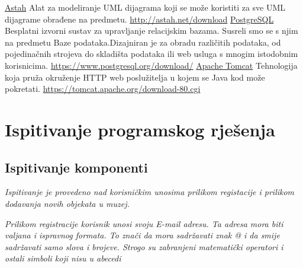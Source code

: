 			 \newline
			 \newline
			 \newpage
			 \noindent
			 \underline{Astah}
			 \newline
			 Alat za modeliranje UML dijagrama koji se može koristiti za sve UML dijagrame obrađene na predmetu.
			 \newline
			 \url{http://astah.net/download}
			 \newline
			 \newline
			 \underline{PostgreSQL}
			 \newline
			 Besplatni izvorni sustav za upravljanje relacijskim bazama. Susreli smo se s njim na predmetu Baze podataka.Dizajniran je za obradu različitih podataka, od pojedinačnih strojeva do skladišta podataka ili web usluga s mnogim istodobnim korisnicima.
			 \newline
			 \url{https://www.postgresql.org/download/}
			 \newline
			 \newline
			 \underline{Apache Tomcat}
			 \newline
			 Tehnologija koja pruža okruženje HTTP web poslužitelja u kojem se Java kod može pokretati.
			 \newline
			 \url{https://tomcat.apache.org/download-80.cgi}
			 \newline
			 \newline
			 
			\eject 
		
	
		\section{Ispitivanje programskog rješenja}
			
			 
	
			
			\subsection{Ispitivanje komponenti}
			\textit{Ispitivanje je provedeno nad korisničkim unosima prilikom registacije i prilikom dodavanja novih objekata u muzej.   }
			
			
			\textit{Prilikom registracije korisnik unosi svoju E-mail adresu. Ta adresa mora biti valjana i ispravnog formata. To znači da mora sadržavati znak @ i da smije sadržavati samo slova i brojeve. Strogo su zabranjeni matematički operatori i ostali simboli koji nisu u abecedi }
			
